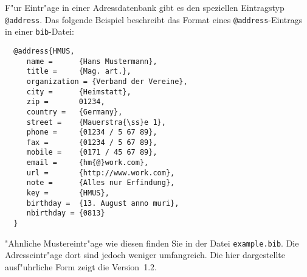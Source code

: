 \documentclass{article}
\newcommand*{\File}[1]{\texttt{#1}}
\begin{document}
F"ur Eintr"age in einer Adressdatenbank gibt es den 
speziellen Eintragstyp \verb|@address|. Das folgende Beispiel 
beschreibt das Format eines \verb|@address|-Eintrags 
in einer \File{bib}-Datei:


\begin{small}
\begin{verbatim}
  @address{HMUS,
     name =      {Hans Mustermann},
     title =     {Mag. art.},
     organization = {Verband der Vereine},
     city =      {Heimstatt},
     zip =       01234,
     country =   {Germany},
     street =    {Mauerstra{\ss}e 1},
     phone =     {01234 / 5 67 89},
     fax =       {01234 / 5 67 89},
     mobile =    {0171 / 45 67 89},
     email =     {hm{@}work.com},
     url =       {http://www.work.com},
     note =      {Alles nur Erfindung},
     key =       {HMUS},
     birthday =  {13. August anno muri},
     nbirthday = {0813}
  }
\end{verbatim}
\end{small}

"Ahnliche Mustereintr"age wie diesen finden Sie in der Datei
\File{example.bib}. Die Adresseintr"age
dort sind jedoch weniger umfangreich. Die hier dargestellte
ausf"uhrliche Form zeigt die Version~1.2.
\end{document}

